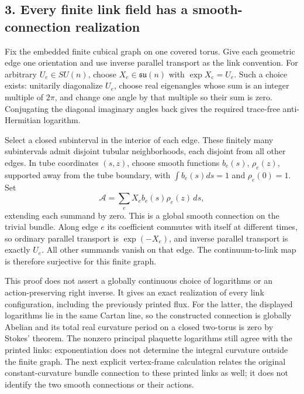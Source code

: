 \documentclass[
  11pt,
]{article}
\begin{document}
\subsection{3. Every finite link field has a smooth-connection
realization}\label{every-finite-link-field-has-a-smooth-connection-realization}

Fix the embedded finite cubical graph on one covered torus. Give each
geometric edge one orientation and use inverse parallel transport as the
link convention. For arbitrary \(U_e\in SU(n)\), choose
\(X_e\in\mathfrak{su}(n)\) with \(\exp X_e=U_e\). Such a choice exists:
unitarily diagonalize \(U_e\), choose real eigenangles whose sum is an
integer multiple of \(2\pi\), and change one angle by that multiple so
their sum is zero. Conjugating the diagonal imaginary angles back gives
the required trace-free anti-Hermitian logarithm.

Select a closed subinterval in the interior of each edge. These finitely
many subintervals admit disjoint tubular neighborhoods, each disjoint
from all other edges. In tube coordinates \((s,z)\), choose smooth
functions \(b_e(s)\), \(\rho_e(z)\), supported away from the tube
boundary, with \(\int b_e(s)ds=1\) and \(\rho_e(0)=1\). Set \[
 \mathscr A=\sum_e X_e b_e(s)\rho_e(z)\,ds,
\] extending each summand by zero. This is a global smooth connection on
the trivial bundle. Along edge \(e\) its coefficient commutes with
itself at different times, so ordinary parallel transport is
\(\exp(-X_e)\), and inverse parallel transport is exactly \(U_e\). All
other summands vanish on that edge. The continuum-to-link map is
therefore surjective for this finite graph.

This proof does not assert a globally continuous choice of logarithms or
an action-preserving right inverse. It gives an exact realization of
every link configuration, including the previously printed flux. For the
latter, the displayed logarithms lie in the same Cartan line, so the
constructed connection is globally Abelian and its total real curvature
period on a closed two-torus is zero by Stokes' theorem. The nonzero
principal plaquette logarithms still agree with the printed links:
exponentiation does not determine the integral curvature outside the
finite graph. The next explicit vertex-frame calculation relates the
original constant-curvature bundle connection to these printed links as
well; it does not identify the two smooth connections or their actions.
\end{document}
